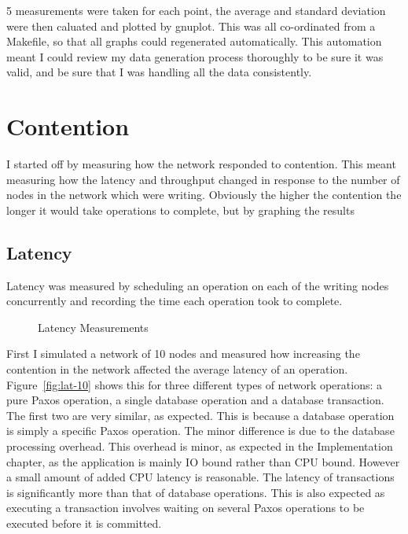 \documentclass[12pt,twoside,notitlepage]{report}
\newcommand{\lwincludegraphics}[2][]{%
  \sbox{0}{\texttt{[image: \#2]}}%
  \ifdim\wd0>\linewidth
    \resizebox{\linewidth}{!}{\box0 }%
  \else
    \leavevmode\box0
  \fi}
\begin{document}
5 measurements were taken for each point, the average and standard deviation were then caluated
and plotted by gnuplot. This was all co-ordinated from a Makefile, so that all graphs could
regenerated automatically. This automation meant I could review my data generation process
thoroughly to be sure it was valid, and be sure that I was handling all the data consistently.

\section{Contention}

I started off by measuring how the network responded to contention. This meant measuring how
the latency and throughput changed in response to the number of nodes in the network
which were writing. Obviously the higher the contention the longer it would take operations to
complete, but by graphing the results 

\subsection{Latency}

Latency was measured by scheduling an operation on each of the writing nodes concurrently and
recording the time each operation took to complete.

\begin{figure}[Hp]
\centering
\caption{Latency Measurements}
\end{figure}

First I simulated a network of 10 nodes and measured how increasing the contention in the network
affected the average latency of an operation. Figure~\ref{fig:lat-10} shows this for three
different types of network operations: a pure Paxos operation, a single database operation and a
database transaction.  The first two are very similar, as expected. This is because a database
operation is simply a specific Paxos operation. The minor difference is due to the database
processing overhead. This overhead is minor, as expected in the Implementation chapter, as the
application is mainly IO bound rather than CPU bound. However a small amount of added CPU latency
is reasonable.  The latency of transactions is significantly more than that of database
operations. This is also expected as executing a transaction involves waiting on several Paxos
operations to be executed before it is committed.
\end{document}

